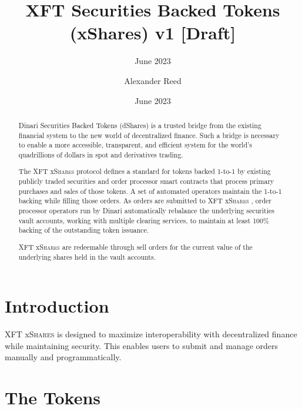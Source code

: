 \documentclass[sigconf,nonacm,prologue,table]{acmart}
\newcommand{\dshares}{\textsc{XFT} x\textsc{Shares} }
\begin{document}
\title{XFT Securities Backed Tokens (xShares) v1 [Draft]}
\subtitle{June 2023}
\date{June 2023}

\author{Alexander Reed}
\affiliation{}

\begin{teaserfigure}
\caption*{
    \hspace{\textwidth}
    }
\end{teaserfigure}

\renewcommand{\shortauthors}{Timothy}

\begin{abstract}

    Dinari Securities Backed Tokens (dShares) is a trusted bridge from the existing financial system to the new world of decentralized finance. Such a bridge is necessary to enable a more accessible, transparent, and efficient system for the world’s quadrillions of dollars in spot and derivatives trading. 
    
    The \dshares protocol defines a standard for tokens backed 1-to-1 by existing publicly traded securities and order processor smart contracts that process primary purchases and sales of those tokens.  A set of automated operators maintain the 1-to-1 backing while filling those orders. As orders are submitted to \dshares, order processor operators run by Dinari automatically rebalance the underlying securities vault accounts, working with multiple clearing services, to maintain at least 100\% backing of the outstanding token issuance.

    \dshares are redeemable through sell orders for the current value of the underlying shares held in the vault accounts.

\end{abstract}

\maketitle

\section{Introduction}
\label{sec:introduction}

\dshares is designed to maximize interoperability with decentralized finance while maintaining security. This enables users to submit and manage orders manually and programmatically.

\section{The Tokens} 
\label{sec:Tokens}
\end{document}
